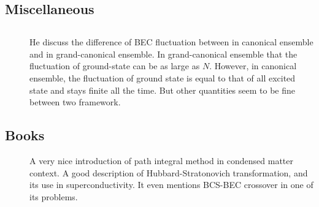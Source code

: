 \subsection{Miscellaneous}
\subsection{}
\begin{description}
\item[\cite{Politzer}]He discuss the difference of BEC fluctuation between in canonical ensemble and in grand-canonical ensemble.  In grand-canonical ensemble that the fluctuation of ground-state can be as large as $N$.  However, in canonical ensemble, the fluctuation of ground state is equal to that of all excited state and stays finite all the time.  But other quantities seem to be fine between two framework.  
\end{description}

\subsection{Books}
\begin{description}
\item[\cite{Altland}]A very nice introduction of path integral method in condensed matter context.  A good description of Hubbard-Stratonovich transformation, and its use in superconductivity.  It even mentions BCS-BEC crossover in one of its problems. 
\end{description}